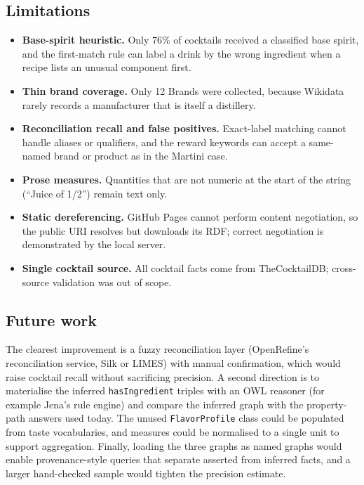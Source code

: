 \subsection{Limitations}

\begin{itemize}[itemsep=1pt]
  \item \textbf{Base-spirit heuristic.} Only 76\% of cocktails received a
        classified base spirit, and the first-match rule can label a drink by
        the wrong ingredient when a recipe lists an unusual component first.
  \item \textbf{Thin brand coverage.} Only 12 Brands were collected, because
        Wikidata rarely records a manufacturer that is itself a distillery.
  \item \textbf{Reconciliation recall and false positives.} Exact-label
        matching cannot handle aliases or qualifiers, and the reward keywords
        can accept a same-named brand or product as in the Martini case.
  \item \textbf{Prose measures.} Quantities that are not numeric at the start
        of the string (``Juice of 1/2'') remain text only.
  \item \textbf{Static dereferencing.} GitHub Pages cannot perform content
        negotiation, so the public URI resolves but downloads its RDF; correct
        negotiation is demonstrated by the local server.
  \item \textbf{Single cocktail source.} All cocktail facts come from
        TheCocktailDB; cross-source validation was out of scope.
\end{itemize}

\subsection{Future work}

The clearest improvement is a fuzzy reconciliation layer (OpenRefine's
reconciliation service, Silk or LIMES) with manual confirmation, which would
raise cocktail recall without sacrificing precision. A second direction is to
materialise the inferred \texttt{hasIngredient} triples with an OWL reasoner
(for example Jena's rule engine) and compare the inferred graph with the
property-path answers used today. The unused \texttt{FlavorProfile} class could
be populated from taste vocabularies, and measures could be normalised to a
single unit to support aggregation. Finally, loading the three graphs as named
graphs would enable provenance-style queries that separate asserted from
inferred facts, and a larger hand-checked sample would tighten the precision
estimate.

